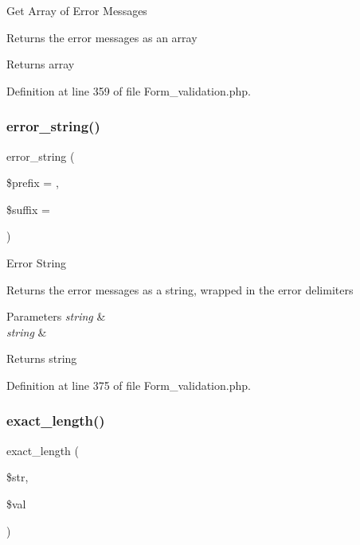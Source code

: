 Get Array of Error Messages

Returns the error messages as an array

\begin{DoxyReturn}{Returns}
array 
\end{DoxyReturn}


Definition at line 359 of file Form\+\_\+validation.\+php.

\mbox{\label{class_c_i___form__validation_a63271bfb23c2963bed80f44fe9c27b09}} 
\subsubsection{\texorpdfstring{error\_string()}{error\_string()}}
{\footnotesize\ttfamily error\+\_\+string (\begin{DoxyParamCaption}\item[{}]{\$prefix = {\ttfamily \textquotesingle{}\textquotesingle{}},  }\item[{}]{\$suffix = {\ttfamily \textquotesingle{}\textquotesingle{}} }\end{DoxyParamCaption})}

Error String

Returns the error messages as a string, wrapped in the error delimiters


\begin{DoxyParams}{Parameters}
{\em string} & \\
\hline
{\em string} & \\
\hline
\end{DoxyParams}
\begin{DoxyReturn}{Returns}
string 
\end{DoxyReturn}


Definition at line 375 of file Form\+\_\+validation.\+php.

\mbox{\label{class_c_i___form__validation_a126edde2bb0ce82d7a202e340a61de9e}} 
\subsubsection{\texorpdfstring{exact\_length()}{exact\_length()}}
{\footnotesize\ttfamily exact\+\_\+length (\begin{DoxyParamCaption}\item[{}]{\$str,  }\item[{}]{\$val }\end{DoxyParamCaption})}


